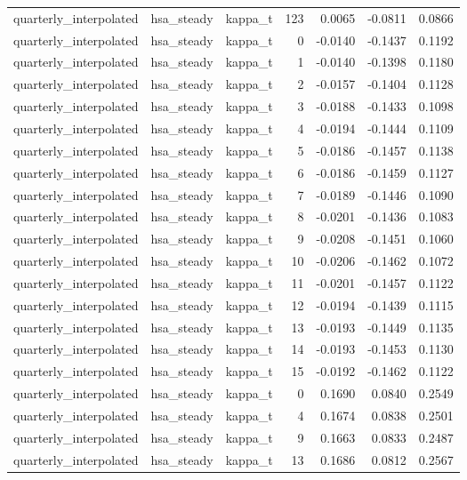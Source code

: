 \begin{tabular}{lllrrrr}
quarterly\_interpolated & hsa\_steady & kappa\_t & 123 & 0.0065 & -0.0811 & 0.0866 \\
quarterly\_interpolated & hsa\_steady & kappa\_t & 0 & -0.0140 & -0.1437 & 0.1192 \\
quarterly\_interpolated & hsa\_steady & kappa\_t & 1 & -0.0140 & -0.1398 & 0.1180 \\
quarterly\_interpolated & hsa\_steady & kappa\_t & 2 & -0.0157 & -0.1404 & 0.1128 \\
quarterly\_interpolated & hsa\_steady & kappa\_t & 3 & -0.0188 & -0.1433 & 0.1098 \\
quarterly\_interpolated & hsa\_steady & kappa\_t & 4 & -0.0194 & -0.1444 & 0.1109 \\
quarterly\_interpolated & hsa\_steady & kappa\_t & 5 & -0.0186 & -0.1457 & 0.1138 \\
quarterly\_interpolated & hsa\_steady & kappa\_t & 6 & -0.0186 & -0.1459 & 0.1127 \\
quarterly\_interpolated & hsa\_steady & kappa\_t & 7 & -0.0189 & -0.1446 & 0.1090 \\
quarterly\_interpolated & hsa\_steady & kappa\_t & 8 & -0.0201 & -0.1436 & 0.1083 \\
quarterly\_interpolated & hsa\_steady & kappa\_t & 9 & -0.0208 & -0.1451 & 0.1060 \\
quarterly\_interpolated & hsa\_steady & kappa\_t & 10 & -0.0206 & -0.1462 & 0.1072 \\
quarterly\_interpolated & hsa\_steady & kappa\_t & 11 & -0.0201 & -0.1457 & 0.1122 \\
quarterly\_interpolated & hsa\_steady & kappa\_t & 12 & -0.0194 & -0.1439 & 0.1115 \\
quarterly\_interpolated & hsa\_steady & kappa\_t & 13 & -0.0193 & -0.1449 & 0.1135 \\
quarterly\_interpolated & hsa\_steady & kappa\_t & 14 & -0.0193 & -0.1453 & 0.1130 \\
quarterly\_interpolated & hsa\_steady & kappa\_t & 15 & -0.0192 & -0.1462 & 0.1122 \\
quarterly\_interpolated & hsa\_steady & kappa\_t & 0 & 0.1690 & 0.0840 & 0.2549 \\
quarterly\_interpolated & hsa\_steady & kappa\_t & 4 & 0.1674 & 0.0838 & 0.2501 \\
quarterly\_interpolated & hsa\_steady & kappa\_t & 9 & 0.1663 & 0.0833 & 0.2487 \\
quarterly\_interpolated & hsa\_steady & kappa\_t & 13 & 0.1686 & 0.0812 & 0.2567 \\

\end{tabular}
